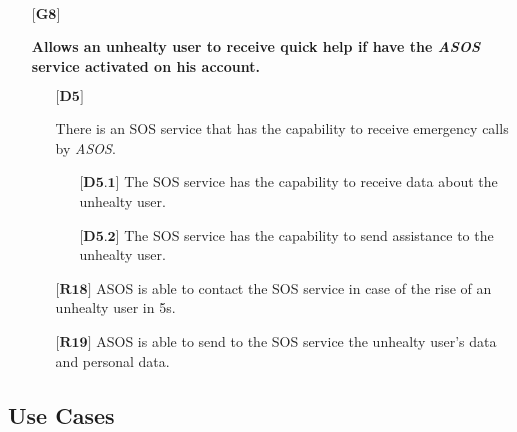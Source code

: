 \begin{itemize}
	\item[${\textbf{[G8]}}$] {\textbf{Allows an unhealty user to receive quick help if have the \hbox{\emph{ASOS}} service activated on his account.}
		\begin{itemize}
			\item[$\textbf{[D5]}$] {There is an SOS service that has the capability to receive emergency calls by \hbox{\emph{ASOS}}.
				\begin{itemize}
					\item[$\textbf{[D5.1]}$] {The SOS service has the capability to receive data about the unhealty user.}
					\item[$\textbf{[D5.2]}$] {The SOS service has the capability to send assistance to the unhealty user.}
				\end{itemize}}
			\item[$\textbf{[R18]}$] {ASOS is able to contact the SOS service in case of the rise of an unhealty user in 5s.}
			\item[$\textbf{[R19]}$] {ASOS is able to send to the SOS service the unhealty user's data and personal data.}
		\end{itemize}}
\end{itemize}

\subsection{Use Cases}
